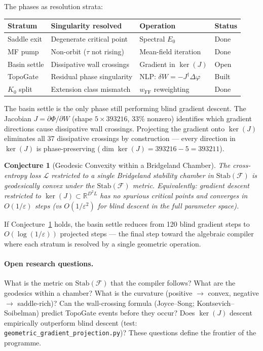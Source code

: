 \documentclass[11pt]{amsart}
\newtheorem{conjecture}[theorem]{Conjecture}
\begin{document}
The phases as resolution strata:

\begin{center}\small
\begin{tabular}{@{}llll@{}}
\toprule
Stratum & Singularity resolved & Operation & Status \\
\midrule
Saddle exit & Degenerate critical point & Spectral $E_0$ & Done \\
MF pump & Non-orbit ($\tau$ not rising) & Mean-field iteration & Done \\
Basin settle & Dissipative wall crossings & Gradient in $\ker(J)$ & Open \\
TopoGate & Residual phase singularity & NLP: $\delta W = -J^\dagger \Delta\varphi$ & Built \\
$K_0$ split & Extension class mismatch & $w_\mathrm{FF}$ reweighting & Done \\
\bottomrule
\end{tabular}
\end{center}

The basin settle is the only phase still performing blind gradient descent.
The Jacobian $J = \partial\Phi/\partial W$ (shape $5 \times 393216$,
33\% nonzero) identifies which gradient directions cause dissipative
wall crossings.
Projecting the gradient onto $\ker(J)$ eliminates all 37 dissipative
crossings by construction --- every direction in $\ker(J)$ is
phase-preserving ($\dim\ker(J) = 393216 - 5 = 393211$).

\begin{conjecture}[Geodesic Convexity within a Bridgeland Chamber]
\label{conj:geodesic_convex}
The cross-entropy loss $\mathcal{L}$ restricted to a single Bridgeland
stability chamber in $\mathrm{Stab}(\mathcal{F})$ is geodesically convex
under the $\mathrm{Stab}(\mathcal{F})$ metric.
Equivalently: gradient descent restricted to $\ker(J) \subset \mathbb{R}^{D^2 L}$
has no spurious critical points and converges in $O(1/\varepsilon)$ steps
(vs $O(1/\varepsilon^2)$ for blind descent in the full parameter space).
\end{conjecture}

If Conjecture~\ref{conj:geodesic_convex} holds, the basin settle reduces
from 120 blind gradient steps to $O(\log(1/\varepsilon))$ projected steps ---
the final step toward the algebraic compiler where each stratum is resolved
by a single geometric operation.

\paragraph{Open research questions.}
What is the metric on $\mathrm{Stab}(\mathcal{F})$ that the compiler follows?
What are the geodesics within a chamber?
What is the curvature (positive $\to$ convex, negative $\to$ saddle-rich)?
Can the wall-crossing formula (Joyce--Song; Kontsevich--Soibelman) predict
TopoGate events before they occur?
Does $\ker(J)$ descent empirically outperform blind descent
(test: \texttt{geometric\_gradient\_projection.py})?
These questions define the frontier of the programme.
\end{document}
